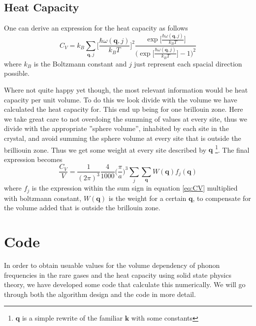 \documentclass[11pt]{article}
\begin{document}
\subsection{Heat Capacity}
One can derive an expression for the heat capacity as follows\cite{bib:solid}
\begin{equation}
	C_V = k_B \sum_{\mathbf{q}, j} \Big[\frac{\hbar \omega(\mathbf{q},j)}{k_B T}\Big]^2
	\frac{\exp{\Big[\frac{\hbar \omega(\mathbf{q},j)}{k_B T}\Big]}}{\Big(\exp{\Big[\frac{\hbar \omega(\mathbf{q},j)}{k_B T}\Big]}-1\Big)^2}
	\label{eq:CV}
\end{equation}
where $k_B$ is the Boltzmann constant and $j$ just represent each spacial direction possible. 

Where not quite happy yet though, the most relevant information would be heat capacity per unit volume. To do this we look divide with the volume we have calculated the heat capacity for. This end up being for one brillouin zone. Here we take great care to not overdoing the summing of values at every site, thus we divide with the appropriate ''sphere volume'', inhabited by each site in the crystal, and avoid summing the sphere volume at every site that is outside the brilliouin zone. Thus we get some weight at every site described by $\mathbf{q}$ \footnote{$\mathbf{q}$ is a simple rewrite of the familiar $\mathbf{k}$ with some constants}. The final expression becomes
\begin{equation}
	\frac{C_V}{V} = \frac{1}{(2\pi)^3} \frac{4}{1000} \big(\frac{\pi}{a})^3 \sum_j \sum_{\mathbf{q}} W(\mathbf{q})f_j(\mathbf{q}) 
\end{equation}
where $f_j$ is the expression within the sum sign in equation \ref{eq:CV} multiplied with boltzmann constant, $W(\mathbf{q})$ is the weight for a certain $\mathbf{q}$, to compensate for the volume added that is outside the brillouin zone. 

\section{Code}
In order to obtain usuable values for the volume dependency of phonon frequencies in the rare gases and the heat capacity using solid state physics theory, we have developed some code that calculate this numerically. We will go through both the algorithm design and the code in more detail. 
\end{document}
